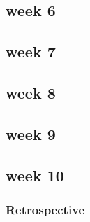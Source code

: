 \documentclass[onecolumn, draftclsnofoot,10pt, compsoc]{IEEEtran}
\begin{document}
\subsection{week 6}
\subsection{week 7}
\subsection{week 8}
\subsection{week 9}
\subsection{week 10}

\subsubsection{Retrospective }






\end{document}
